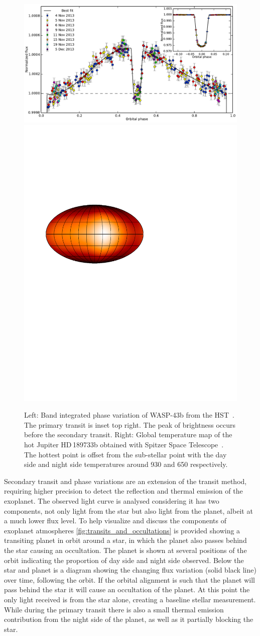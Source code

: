 \begin{figure}
    \centering
    \includegraphics[width=0.5\linewidth]{figures/introduction/stevenson_phasecurve2014.pdf}
    \includegraphics[width=0.4\linewidth]{figures/introduction/knutson_2007_temperature_map_HD_189733b.pdf}
    \caption[Exoplanet phase variations and temperature map.]{Left: Band integrated phase variation of {WASP-43b} from the HST~\citep{stevenson_thermal_2014}.
        The primary transit is inset top right.
        The peak of brightness occurs before the secondary transit.
        Right: Global temperature map of the hot Jupiter HD\,189733b obtained with {Spitzer Space Telescope}~\citep{knutson_map_2007}.
        The hottest point is offset from the sub-stellar point with the day side and night side temperatures around 930\K{} and 650\K{} respectively.}
    \label{fig:phasecurve2014_and_temp_map}
\end{figure}

Secondary transit and phase variations are an extension of the transit method, requiring higher precision to detect the reflection and thermal emission of the exoplanet.
The observed light curve is analysed considering it has two components, not only light from the star but also light from the planet, albeit at a much lower flux level.
To help visualize and discuss the components of exoplanet atmospheres \cref{fig:transits_and_occultations} is provided showing a transiting planet in orbit around a star, in which the planet also passes behind the star causing an occultation.
The planet is shown at several positions of the orbit indicating the proportion of day side and night side observed.
Below the star and planet is a diagram showing the changing flux variation (solid black line) over time, following the orbit.
If the orbital alignment is such that the planet will pass behind the star it will cause an occultation of the planet.
At this point the only light received is from the star alone, creating a baseline stellar measurement.
While during the primary transit there is also a small thermal emission contribution from the night side of the planet, as well as it partially blocking the star.

